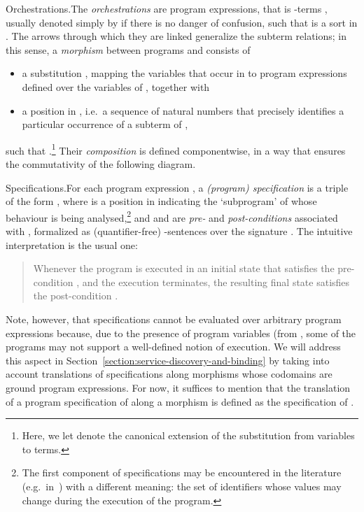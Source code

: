 \documentclass{LMCS}
\begin{document}
\begin{minisection}{Orchestrations.}The \emph{orchestrations} are program expressions, that is \nb-terms , usually denoted simply by  if there is no danger of confusion, such that  is a sort in .
  The arrows through which they are linked  generalize the subterm relations; in this sense, a \emph{morphism}  between programs  and  consists of 
  \begin{itemize}

  \item a substitution , mapping the variables that occur in  to program expressions defined over the variables of , together with

  \item a position  in , i.e.\ a sequence of natural numbers that precisely identifies a particular occurrence of a subterm  of ,

  \end{itemize}
  such that .\footnote{Here, we let  denote the canonical extension of the substitution  from variables to terms.}
  Their \emph{composition} is defined componentwise, in a way that ensures the commutativity of the following diagram.
  
\end{minisection}

\begin{minisection}{Specifications.}For each program expression , a \emph{(program) specification} is a triple of the form , where  is a position in  indicating the `subprogram' of  whose behaviour is being analysed,\footnote{The first component of specifications may be encountered in the literature (e.g.\ in~\cite{Morgan:Programming-from-Specifications-1994}) with a different meaning: the set of identifiers whose values may change during the execution of the program.} and  and  are \emph{pre-} and \emph{post-conditions} associated with , formalized as (quantifier-free) \nb-sentences over the signature .
  The intuitive interpretation is the usual one: 
  \begin{quotation}
    \noindent Whenever the program  is executed in an initial state that satisfies the pre-condition , and the execution terminates, the resulting final state satisfies the post-condition .
  \end{quotation}
  Note, however, that specifications cannot be evaluated over arbitrary program expressions because, due to the presence of program variables (from , some of the programs may not support a well-defined notion of execution.
  We will address this aspect in Section~\ref{section:service-discovery-and-binding} by taking into account translations of specifications along morphisms whose codomains are ground program expressions.
  For now, it suffices to mention that the translation of a program specification  of  along a morphism  is defined as the specification  of .
\end{minisection}
\end{document}
